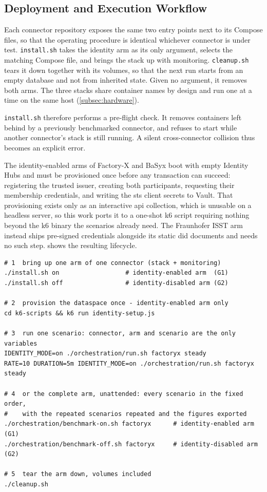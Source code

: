 \subsection{Deployment and Execution Workflow}\label{subsec:workflow}

Each connector repository exposes the same two entry points next to its Compose files, so that the operating procedure is identical whichever connector is under test. \texttt{install.sh} takes the identity arm as its only argument, selects the matching Compose file, and brings the stack up with monitoring. \texttt{cleanup.sh} tears it down together with its volumes, so that the next run starts from an empty database and not from inherited state. Given no argument, it removes both arms. The three stacks share container names by design and run one at a time on the same host (\cref{subsec:hardware}).

\texttt{install.sh} therefore performs a pre-flight check. It removes containers left behind by a previously benchmarked connector, and refuses to start while another connector's stack is still running. A silent cross-connector collision thus becomes an explicit error.

\pagebreak

The identity-enabled arms of Factory-X and BaSyx boot with empty Identity Hubs and must be provisioned once before any transaction can succeed: registering the trusted issuer, creating both participants, requesting their membership credentials, and writing the \gls{sts} client secrets to Vault. That provisioning exists only as an interactive \gls{api} collection, which is unusable on a headless server, so this work ports it to a one-shot k6 script requiring nothing beyond the k6 binary the scenarios already need. The Fraunhofer ISST arm instead ships pre-signed credentials alongside its static \gls{did} documents and needs no such step.  shows the resulting lifecycle.

\begin{lstlisting}[numbers=none, basicstyle=\scriptsize\ttfamily, columns=fixed, caption={Lifecycle of one benchmark arm, from deployment to teardown.}, label=lst:run-workflow]
# 1  bring up one arm of one connector (stack + monitoring)
./install.sh on                  # identity-enabled arm  (G1)
./install.sh off                 # identity-disabled arm (G2)

# 2  provision the dataspace once - identity-enabled arm only
cd k6-scripts && k6 run identity-setup.js

# 3  run one scenario: connector, arm and scenario are the only variables
IDENTITY_MODE=on ./orchestration/run.sh factoryx steady
RATE=10 DURATION=5m IDENTITY_MODE=on ./orchestration/run.sh factoryx steady

# 4  or the complete arm, unattended: every scenario in the fixed order,
#    with the repeated scenarios repeated and the figures exported
./orchestration/benchmark-on.sh factoryx      # identity-enabled arm  (G1)
./orchestration/benchmark-off.sh factoryx     # identity-disabled arm (G2)

# 5  tear the arm down, volumes included
./cleanup.sh
\end{lstlisting}

